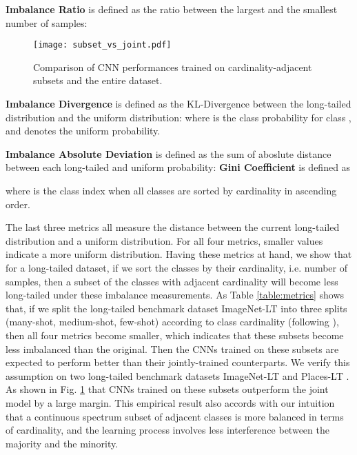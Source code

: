 \documentclass[runningheads]{llncs}
\begin{document}
	
	\noindent\textbf{Imbalance Ratio} \cite{stamatatos2008author} is defined as the ratio between the largest and the smallest number of samples: 
	
	\begin{figure}[htbp]
		\centering
		\texttt{[image: subset\_vs\_joint.pdf]}
		\caption{Comparison of CNN performances trained on cardinality-adjacent subsets and the entire dataset.}
		\label{fig:subset_vs_joint}
	\end{figure}
	
	
	\noindent\textbf{Imbalance Divergence} is defined as the KL-Divergence between the long-tailed distribution and the uniform distribution:  where  is the class probability for class , and  denotes the uniform probability.
	
	\noindent\textbf{Imbalance Absolute Deviation} \cite{collins2018evolutionary} is defined as the sum of aboslute distance between each long-tailed and uniform probability: 
	\noindent\textbf{Gini Coefficient} is defined as
	
	where  is the class index when all classes are sorted by cardinality in ascending order.
	
	The last three metrics all measure the distance between the current long-tailed distribution and a uniform distribution. For all four metrics, smaller values indicate a more uniform distribution. Having these metrics at hand, we show that for a long-tailed dataset, if we sort the classes by their cardinality, i.e. number of samples, then a subset of the classes with adjacent cardinality will become less long-tailed under these imbalance measurements. As Table \ref{table:metrics} shows that, if we split the long-tailed benchmark dataset ImageNet-LT into three splits (many-shot, medium-shot, few-shot) according to class cardinality (following \cite{liu2019large}), then all four metrics become smaller, which indicates that these subsets become less imbalanced than the original. Then the CNNs trained on these subsets are expected to perform better than their jointly-trained counterparts. We verify this assumption on two long-tailed benchmark datasets ImageNet-LT and Places-LT \cite{liu2019large}. As shown in Fig. \ref{fig:subset_vs_joint} that CNNs trained on these subsets outperform the joint model by a large margin. This empirical result also accords with our intuition that a continuous spectrum subset of adjacent classes is more balanced in terms of cardinality, and the learning process involves less interference between the majority and the minority.
	
\end{document}
